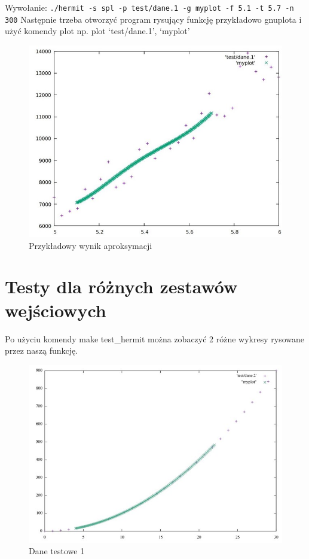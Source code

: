 \documentclass[10pt, a4paper]{report}
\begin{document}
    Wywołanie: 
    \newline\texttt{./hermit -s spl -p test/dane.1 -g myplot -f 5.1 -t 5.7 -n 300} 
    \newline\newline Następnie trzeba otworzyć program rysujący funkcję przykładowo gnuplota i użyć komendy plot np.  plot ‘test/dane.1’, ‘myplot’ 
    \newline
    \begin{figure}[h]
        \begin{center}
            \includegraphics[scale=0.6]{run3.jpg}
            \caption{Przykładowy wynik aproksymacji}
        \end{center}
    \end{figure}

    \section{Testy dla różnych zestawów wejściowych}
    Po użyciu komendy make test\_hermit można zobaczyć 2 różne wykresy rysowane przez naszą funkcję.
    \begin{figure}[h]
        \begin{center}
            \includegraphics[scale=0.6]{test1.jpg}
            \caption{Dane testowe 1}
        \end{center}
    \end{figure}
\end{document}
